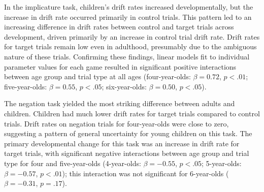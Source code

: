 \documentclass[10pt,letterpaper]{article}
\newcommand{\ejy}[1]{\textcolor{Blue}{[ejy: #1]}}
\newcommand{\aen}[1]{\textcolor{DarkOrange}{[aen: #1]}}
\begin{document}
In the implicature task, children's drift rates increased developmentally, but the increase in drift rate occurred primarily in control trials. This pattern led to an increasing difference in drift rates between control and target trials across development, driven primarily by an increase in control trial drift rate. Drift rates for target trials remain low even in adulthood, presumably due to the ambiguous nature of these trials. Confirming these findings, linear models fit to individual parameter values for each game resulted in significant positive interactions between age group and trial type at all ages (four-year-olds: $\beta = 0.72$, $p <.01$; five-year-olds: $\beta = 0.55$, $p <.05$; six-year-olds: $\beta = 0.50$, $p <.05$).

The negation task yielded the most striking difference between adults and children. Children had much lower drift rates for target trials compared to control trials. Drift rates on negation trials for four-year-olds were close to zero, suggesting a pattern of general uncertainty for young children on this task. The primary developmental change for this task was an increase in drift rate for target trials, with significant negative interactions between age group and trial type for four and five-year-olds (4-year-olds: $\beta = -0.55$, $p <.05$; 5-year-olds: $\beta = -0.57$, $p <.01$); this interaction was not significant for 6-year-olds ($\beta = -0.31$, $p = .17$).


\end{document}
